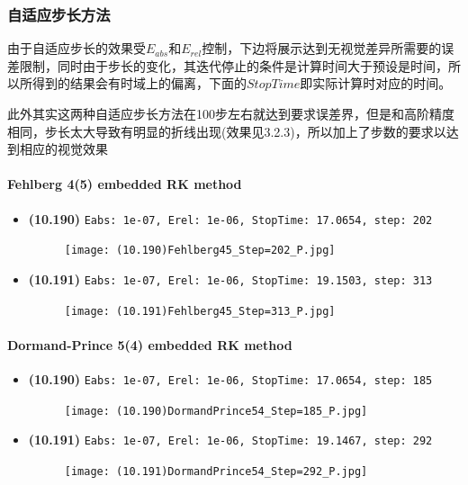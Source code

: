 \documentclass{article}
\begin{document}
\subsubsection{自适应步长方法}

由于自适应步长的效果受$E_{abs}$和$E_{rel}$控制，下边将展示达到无视觉差异所需要的误差限制，同时由于步长的变化，其迭代停止的条件是计算时间大于预设是时间，所以所得到的结果会有时域上的偏离，下面的$StopTime$即实际计算时对应的时间。

此外其实这两种自适应步长方法在100步左右就达到要求误差界，但是和高阶精度相同，步长太大导致有明显的折线出现(效果见3.2.3)，所以加上了步数的要求以达到相应的视觉效果

\paragraph{Fehlberg 4(5) embedded RK method}

\begin{itemize}
    \item \textbf{(10.190)} \verb|Eabs: 1e-07, Erel: 1e-06, StopTime: 17.0654, step: 202|
    \begin{figure}[h]
        \centering
        \texttt{[image: (10.190)Fehlberg45\_Step=202\_P.jpg]}
    \end{figure}
    \newpage
    \item \textbf{(10.191)} \verb|Eabs: 1e-07, Erel: 1e-06, StopTime: 19.1503, step: 313|
    \begin{figure}[h]
        \centering
        \texttt{[image: (10.191)Fehlberg45\_Step=313\_P.jpg]}
    \end{figure}
\end{itemize}


\paragraph{Dormand-Prince 5(4) embedded RK method}

\begin{itemize}
    \item \textbf{(10.190)} \verb|Eabs: 1e-07, Erel: 1e-06, StopTime: 17.0654, step: 185|
    \begin{figure}[h]
        \centering
        \texttt{[image: (10.190)DormandPrince54\_Step=185\_P.jpg]}
    \end{figure}
    \newpage
    \item \textbf{(10.191)} \verb|Eabs: 1e-07, Erel: 1e-06, StopTime: 19.1467, step: 292|
    \begin{figure}[h]
        \centering
        \texttt{[image: (10.191)DormandPrince54\_Step=292\_P.jpg]}
    \end{figure}
\end{itemize}
\end{document}
